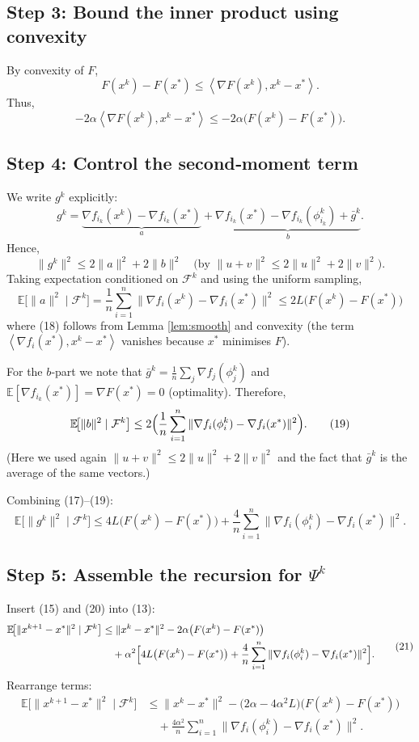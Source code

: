 \documentclass{article}
\newcommand{\E}{\mathbb{E}}
\newcommand{\inner}[2]{\left\langle #1,#2\right\rangle}
\newcommand{\grad}{\nabla}
\begin{document}
\subsection*{Step 3: Bound the inner product using convexity}
By convexity of $F$,
\[
F(x^{k})-F(x^{*})\le\inner{\grad F(x^{k})}{x^{k}-x^{*}}.
\tag{14}
\]
Thus,
\[
-2\alpha\inner{\grad F(x^{k})}{x^{k}-x^{*}}
\le -2\alpha\bigl(F(x^{k})-F(x^{*})\bigr).
\tag{15}
\]

\subsection*{Step 4: Control the second‑moment term}
We write $g^{k}$ explicitly:
\[
g^{k}= \underbrace{\grad f_{i_k}(x^{k})-\grad f_{i_k}(x^{*})}_{\displaystyle a}
+ \underbrace{\grad f_{i_k}(x^{*})-\grad f_{i_k}(\phi_{i_k}^{k})+\bar g^{k}}_{\displaystyle b}.
\tag{16}
\]
Hence,
\[
\|g^{k}\|^{2}\le 2\|a\|^{2}+2\|b\|^{2}\quad\text{(by } \|u+v\|^{2}\le 2\|u\|^{2}+2\|v\|^{2}\text{)}.
\tag{17}
\]
Taking expectation conditioned on $\mathcal{F}^{k}$ and using the uniform sampling,
\[
\E\!\bigl[\|a\|^{2}\mid\mathcal{F}^{k}\bigr]
= \frac1n\sum_{i=1}^{n}\|\grad f_i(x^{k})-\grad f_i(x^{*})\|^{2}
\le 2L\bigl(F(x^{k})-F(x^{*})\bigr)
\tag{18}
\]
where (18) follows from Lemma \ref{lem:smooth} and convexity (the term $\inner{\grad f_i(x^{*})}{x^{k}-x^{*}}$ vanishes because $x^{*}$ minimises $F$).

For the $b$‑part we note that $\bar g^{k}= \frac1n\sum_{j}\grad f_j(\phi_j^{k})$ and $\E[\grad f_{i_k}(x^{*})]=\grad F(x^{*})=0$ (optimality). Therefore,
\[
\E\!\bigl[\|b\|^{2}\mid\mathcal{F}^{k}\bigr]
\le 2\Bigl(
\frac1n\sum_{i=1}^{n}\|\grad f_i(\phi_i^{k})-\grad f_i(x^{*})\|^{2}
\Bigr).
\tag{19}
\]
(Here we used again $\|u+v\|^{2}\le 2\|u\|^{2}+2\|v\|^{2}$ and the fact that $\bar g^{k}$ is the average of the same vectors.)

Combining (17)–(19):
\[
\E\!\bigl[\|g^{k}\|^{2}\mid\mathcal{F}^{k}\bigr]
\le 4L\bigl(F(x^{k})-F(x^{*})\bigr)
+ \frac{4}{n}\sum_{i=1}^{n}\|\grad f_i(\phi_i^{k})-\grad f_i(x^{*})\|^{2}.
\tag{20}
\]

\subsection*{Step 5: Assemble the recursion for $\Psi^{k}$}
Insert (15) and (20) into (13):
\[
\begin{aligned}
\E\!\bigl[\|x^{k+1}-x^{*}\|^{2}\mid\mathcal{F}^{k}\bigr]
&\le \|x^{k}-x^{*}\|^{2}
-2\alpha\bigl(F(x^{k})-F(x^{*})\bigr) \\
&\quad +\alpha^{2}\Bigl[4L\bigl(F(x^{k})-F(x^{*})\bigr)
+ \frac{4}{n}\sum_{i=1}^{n}\|\grad f_i(\phi_i^{k})-\grad f_i(x^{*})\|^{2}\Bigr].
\end{aligned}
\tag{21}
\]
Rearrange terms:
\[
\begin{aligned}
\E\!\bigl[\|x^{k+1}-x^{*}\|^{2}\mid\mathcal{F}^{k}\bigr]
&\le \|x^{k}-x^{*}\|^{2}
-\bigl(2\alpha-4\alpha^{2}L\bigr)\bigl(F(x^{k})-F(x^{*})\bigr) \\
&\quad +\frac{4\alpha^{2}}{n}\sum_{i=1}^{n}\|\grad f_i(\phi_i^{k})-\grad f_i(x^{*})\|^{2}.
\end{aligned}
\tag{22}
\]
\end{document}
